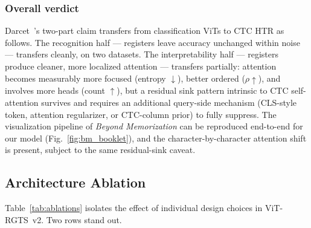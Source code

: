 \subsubsection{Overall verdict}

Darcet~\etal's two-part claim transfers from classification ViTs to CTC HTR as follows. The recognition half --- registers leave accuracy unchanged within noise --- transfers cleanly, on two datasets. The interpretability half --- registers produce cleaner, more localized attention --- transfers partially: attention becomes measurably more focused (entropy $\downarrow$), better ordered ($\rho \uparrow$), and involves more heads (count $\uparrow$), but a residual sink pattern intrinsic to CTC self-attention survives and requires an additional query-side mechanism (CLS-style token, attention regularizer, or CTC-column prior) to fully suppress. The visualization pipeline of \emph{Beyond Memorization} can be reproduced end-to-end for our model (Fig.~\ref{fig:bm_booklet}), and the character-by-character attention shift is present, subject to the same residual-sink caveat.

\subsection{Architecture Ablation}
\label{sec:res_abl_arch}

Table~\ref{tab:ablations} isolates the effect of individual design choices in ViT-RGTS~v2. Two rows stand out.

